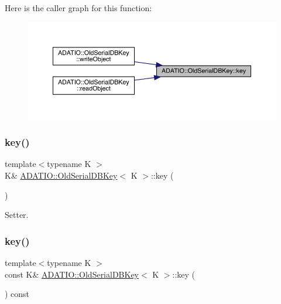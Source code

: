 Here is the caller graph for this function\+:\nopagebreak
\begin{figure}[H]
\begin{center}
\leavevmode
\includegraphics[width=350pt]{dc/d7d/classADATIO_1_1OldSerialDBKey_ab191c26e658125d7ac4378c8b74d6f1b_icgraph}
\end{center}
\end{figure}
\mbox{\label{classADATIO_1_1OldSerialDBKey_ab191c26e658125d7ac4378c8b74d6f1b}} 
\subsubsection{\texorpdfstring{key()}{key()}\hspace{0.1cm}{\footnotesize\ttfamily [2/4]}}
{\footnotesize\ttfamily template$<$typename K $>$ \\
K\& \mbox{\hyperlink{classADATIO_1_1OldSerialDBKey}{A\+D\+A\+T\+I\+O\+::\+Old\+Serial\+D\+B\+Key}}$<$ K $>$\+::key (\begin{DoxyParamCaption}{ }\end{DoxyParamCaption})\hspace{0.3cm}{\ttfamily [inline]}}



Setter. 

\mbox{\label{classADATIO_1_1OldSerialDBKey_a10d8c5351439c43bacb5e365750e7b1d}} 
\subsubsection{\texorpdfstring{key()}{key()}\hspace{0.1cm}{\footnotesize\ttfamily [3/4]}}
{\footnotesize\ttfamily template$<$typename K $>$ \\
const K\& \mbox{\hyperlink{classADATIO_1_1OldSerialDBKey}{A\+D\+A\+T\+I\+O\+::\+Old\+Serial\+D\+B\+Key}}$<$ K $>$\+::key (\begin{DoxyParamCaption}{ }\end{DoxyParamCaption}) const\hspace{0.3cm}{\ttfamily [inline]}}



